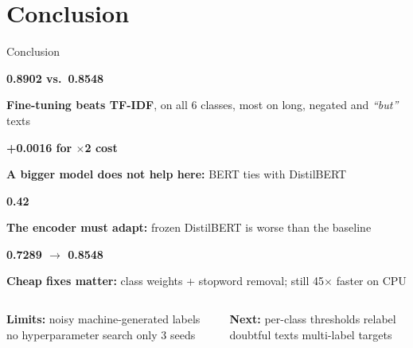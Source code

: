 \documentclass[aspectratio=169,10pt,t]{beamer}
\newcommand{\sbf}{\bfseries}
\newcommand{\quot}[1]{\textit{``#1''}}
\begin{document}
\section{Conclusion}
\begin{frame}{Conclusion}
\vskip2pt
\begin{tcbraster}[raster columns=2,raster equal height,raster column skip=6pt,raster row skip=5pt]
  \begin{card}
    {\fontsize{14}{16}\bfseries\color{navy}0.8902 vs.\ 0.8548}\par\vskip2pt
    {\footnotesize{\sbf Fine-tuning beats TF-IDF}, on all 6 classes, most on long, negated and \quot{but} texts}
  \end{card}
  \begin{card}
    {\fontsize{14}{16}\bfseries\color{navy}+0.0016 for $\times$2 cost}\par\vskip2pt
    {\footnotesize{\sbf A bigger model does not help here:} BERT ties with DistilBERT}
  \end{card}
  \begin{card}
    {\fontsize{14}{16}\bfseries\color{navy}0.42}\par\vskip2pt
    {\footnotesize{\sbf The encoder must adapt:} frozen DistilBERT is worse than the baseline}
  \end{card}
  \begin{card}
    {\fontsize{14}{16}\bfseries\color{navy}0.7289 $\rightarrow$ 0.8548}\par\vskip2pt
    {\footnotesize{\sbf Cheap fixes matter:} class weights + stopword removal; still 45$\times$ faster on CPU}
  \end{card}
\end{tcbraster}
\vskip6pt
\begin{columns}[T,onlytextwidth]
\begin{softcard}
  {\scriptsize{\sbf Limits:} noisy machine-generated labels \textperiodcentered{} no hyperparameter search \textperiodcentered{} only 3 seeds}
\end{softcard}
\begin{softcard}
  {\scriptsize{\sbf Next:} per-class thresholds \textperiodcentered{} relabel doubtful texts \textperiodcentered{} multi-label targets}
\end{softcard}
\end{columns}
\end{frame}
\end{document}
